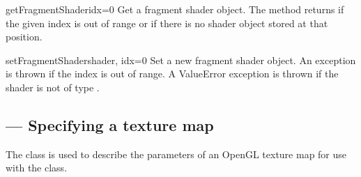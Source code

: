\begin{methoddesc}{getFragmentShader}{idx=0}
Get a fragment shader object. The method returns  if the given index
is out of range or if there is no shader object stored at that position.
\end{methoddesc}

\begin{methoddesc}{setFragmentShader}{shader, idx=0}
Set a new fragment shader object. An  exception is 
thrown if the index is out of range. A ValueError exception is thrown if the 
shader is not of type .
\end{methoddesc}

\subsection{ --- Specifying a texture map}

The  class is used to describe the parameters of an
OpenGL texture map for use with the  class.


